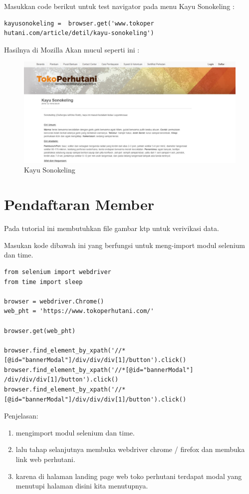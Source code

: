Masukkan code berikut untuk test navigator pada menu Kayu Sonokeling :
\begin{verbatim}
kayusonokeling =  browser.get('www.tokoper
hutani.com/article/detil/kayu-sonokeling')
\end{verbatim}

Hasilnya  di Mozilla Akan mucul seperti ini :
\begin{figure}[h]
	\centering
	\includegraphics[scale=0.25]{figures/j3}
	\caption{Kayu Sonokeling}
\end{figure}

\newpage
\section{Pendaftaran Member}
Pada tutorial ini membutuhkan file gambar ktp untuk verivikasi data.

Masukan kode dibawah ini yang berfungsi untuk meng-import modul selenium dan time.
\begin{verbatim}
from selenium import webdriver
from time import sleep

browser = webdriver.Chrome()
web_pht = 'https://www.tokoperhutani.com/'

browser.get(web_pht)

browser.find_element_by_xpath('//*[@id="bannerModal"]/div/div/div[1]/button').click()
browser.find_element_by_xpath('//*[@id="bannerModal"]
/div/div/div[1]/button').click()
browser.find_element_by_xpath('//*[@id="bannerModal"]/div/div/div[1]/button').click()

\end{verbatim}

Penjelasan:
\begin{enumerate}
	\item mengimport modul selenium dan time.
	\item lalu tahap selanjutnya membuka webdriver chrome / firefox dan membuka link web perhutani.
	\item karena di halaman landing page web toko perhutani terdapat modal yang menutupi halaman disini kita menutupnya.
\end{enumerate}


